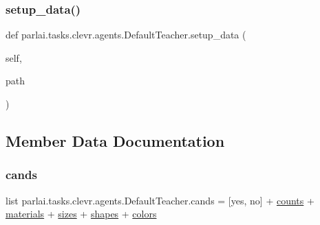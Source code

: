 \subsubsection{\texorpdfstring{setup\+\_\+data()}{setup\_data()}}
{\footnotesize\ttfamily def parlai.\+tasks.\+clevr.\+agents.\+Default\+Teacher.\+setup\+\_\+data (\begin{DoxyParamCaption}\item[{}]{self,  }\item[{}]{path }\end{DoxyParamCaption})}



\subsection{Member Data Documentation}
\mbox{\label{classparlai_1_1tasks_1_1clevr_1_1agents_1_1DefaultTeacher_ac6422c7d4dc173edcbafae2ce5f2552b}} 
\subsubsection{\texorpdfstring{cands}{cands}}
{\footnotesize\ttfamily list parlai.\+tasks.\+clevr.\+agents.\+Default\+Teacher.\+cands = \mbox{[}\textquotesingle{}yes\textquotesingle{}, \textquotesingle{}no\textquotesingle{}\mbox{]} + \hyperlink{namespaceparlai_1_1tasks_1_1clevr_1_1agents_addbc9f5c2379e29136fbbf55b1dfb333}{counts} + \hyperlink{namespaceparlai_1_1tasks_1_1clevr_1_1agents_a73f08794aae5cb7c2a5cc9d1d662e082}{materials} + \hyperlink{namespaceparlai_1_1tasks_1_1clevr_1_1agents_a565c7b5d57a9f93a062d7a130f6ba989}{sizes} + \hyperlink{namespaceparlai_1_1tasks_1_1clevr_1_1agents_ac54e3cd91825301baef61b929e13c0b4}{shapes} + \hyperlink{namespaceparlai_1_1tasks_1_1clevr_1_1agents_a18c5435aea4ab46265cd4c70c7f04718}{colors}\hspace{0.3cm}{\ttfamily [static]}}

\mbox{\label{classparlai_1_1tasks_1_1clevr_1_1agents_1_1DefaultTeacher_a7bdb21c7cb0d04c3470c069125ea3d4a}} 

